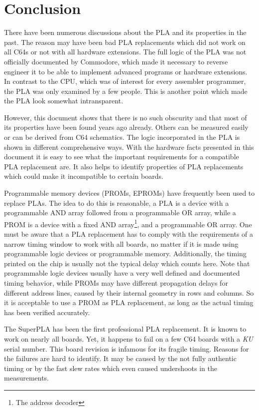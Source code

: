 \chapter{Conclusion}
\label{sec:conclusion}

There have been numerous discussions about the PLA and its properties in the
past. The reason may have been bad PLA replacements which did not work on
all C64s or not with all hardware extensions. The full logic of the PLA was
not officially documented by Commodore, which made it necessary to reverse
engineer it to be able to implement advanced programs or hardware
extensions. In contrast to the CPU, which was of interest for every
assembler programmer, the PLA was only examined by a few people. This is
another point which made the PLA look somewhat intransparent.

However, this document shows that there is no such obscurity and that most
of its properties have been found years ago already. Others can be measured
easily or can be derived from C64 schematics. The logic incorporated in the
PLA is shown in different comprehensive ways. With the hardware facts
presented in this document it is easy to see what the important requirements
for a compatible PLA replacement are. It also helps to identify properties
of PLA replacements which could make it incompatible to certain boards.

Programmable memory devices (PROMs, EPROMs) have frequently been used to
replace PLAs. The idea to do this is reasonable, a PLA is a device with a
programmable AND array followed from a programmable OR array, while a PROM
is a device with a fixed AND array\footnote{The address decoder}, and a
programmable OR array. One must be aware that a PLA replacement has to
comply with the requirements of a narrow timing window to work with all
boards, no matter if it is made using programmable logic devices or
programmable memory. Additionally, the timing printed on the chip is usually
not the typical delay which counts here. Note that programmable logic
devices usually have a very well defined and documented timing behavior,
while PROMs may have different propagation delays for different address
lines, caused by their internal geometry in rows and columns. So it is
acceptable to use a PROM as PLA replacement, as long as the actual timing
has been verified accurately.

The SuperPLA has been the first professional PLA replacement. It is known to
work on nearly all boards. Yet, it happens to fail on a few C64 boards with
a \textit{KU} serial number. This board revision is infamous for its fragile
timing. Reasons for the failures are hard to identify. It may be caused by
the not fully authentic timing or by the fast slew rates which even caused
undershoots in the measurements.

